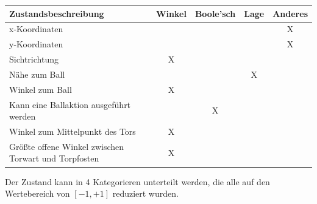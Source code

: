             \begin{table}[H]
                \begin{center}
                \hspace*{-0.75cm}
                \begin{tabular}{ |l|c|c|c|c| } 
                    \hline
                    \hfill Zustandsbeschreibung                          & Winkel & Boole'sch & Lage & Anderes \\ \hline
                    x-Koordinaten                                        & \hfill & \hfill    &      & X       \\ \hline
                    y-Koordinaten                                        & \hfill & \hfill    &      & X       \\ \hline
                    Sichtrichtung                                        & X      & \hfill    &      & \hfill  \\ \hline
                    Nähe zum Ball                                        & \hfill & \hfill    & X    & \hfill  \\ \hline
                    Winkel zum Ball                                      & X      & \hfill    &      & \hfill  \\ \hline
                    Kann eine Ballaktion ausgeführt werden               & \hfill & X         &      & \hfill  \\ \hline
                    Winkel zum Mittelpunkt des Tors                      & X      & \hfill    &      & \hfill  \\ \hline
                    Größte offene Winkel zwischen Torwart und Torpfosten & X      & \hfill    &      & \hfill  \\ \hline
                \end{tabular}
                \end{center}
            \end{table}

            \noindent
            Der Zustand kann in 4 Kategorieren unterteilt werden, die alle auf den Wertebereich von $[ -1, +1 ]$ reduziert wurden.

